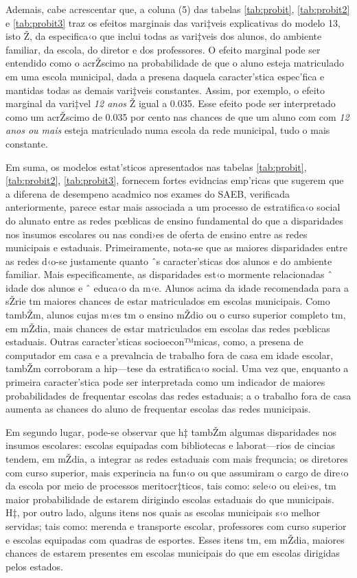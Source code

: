 \documentclass[a4paper, 12pt]{article}
\begin{document}
Ademais, cabe acrescentar que, a coluna (5) das tabelas \ref{tab:probit},  \ref{tab:probit2} e  \ref{tab:probit3} traz os efeitos marginais das vari‡veis explicativas do modelo 13, isto Ž, da especifica‹o que inclui todas as vari‡veis dos alunos, do ambiente familiar, da escola, do diretor e dos professores. O efeito marginal pode ser entendido como o acrŽscimo na probabilidade de que o aluno esteja matriculado em uma escola municipal, dada a presena daquela caracter’stica espec’fica e mantidas todas as demais vari‡veis constantes. Assim, por exemplo, o efeito marginal da vari‡vel \emph{12 anos} Ž igual a 0.035. Esse efeito pode ser interpretado como um acrŽscimo de 0.035 por cento nas chances de que um aluno com com \emph{12 anos ou mais} esteja matriculado numa escola da rede municipal, tudo o mais constante. 

Em suma, os modelos estat’sticos apresentados nas tabelas \ref{tab:probit}, \ref{tab:probit2}, \ref{tab:probit3}, fornecem fortes evidncias emp’ricas que sugerem que a diferena de desempeno acadmico nos exames do SAEB, verificada anteriormente, parece estar mais associada a um processo de estratifica‹o social do alunato entre as redes pœblicas de ensino fundamental do que a disparidades nos insumos escolares ou nas condi›es de oferta de ensino entre as redes municipais e estaduais. Primeiramente, nota-se que as maiores disparidades entre as redes d‹o-se justamente quanto ˆs caracter’sticas dos alunos e do ambiente familiar. Mais especificamente, as disparidades est‹o mormente relacionadas ˆ idade dos alunos e ˆ educa‹o da m‹e. Alunos acima da idade recomendada para a sŽrie tm maiores chances de estar matriculados em escolas municipais. Como tambŽm, alunos cujas m‹es tm o ensino mŽdio ou o curso superior completo tm, em mŽdia, mais chances de estar matriculados em escolas das redes pœblicas estaduais. Outras caracter’sticas socioecon™micas, como, a presena de computador em casa e a prevalncia de trabalho fora de casa em idade escolar, tambŽm corroboram a hip—tese da estratifica‹o social. Uma vez que, enquanto a primeira caracter’stica pode ser interpretada como um indicador de maiores probabilidades de frequentar escolas das redes estaduais; a o trabalho fora de casa aumenta as chances do aluno de frequentar escolas das redes municipais.

Em segundo lugar, pode-se observar que h‡ tambŽm algumas disparidades nos insumos escolares: escolas equipadas com bibliotecas e laborat—rios de cincias tendem, em mŽdia, a integrar as redes estaduais com mais frequncia; os diretores com curso superior, mais experincia na fun‹o ou que assumiram o cargo de dire‹o da escola por meio de processos meritocr‡ticos, tais como: sele‹o ou elei›es, tm maior probabilidade de estarem dirigindo escolas estaduais do que municipais. H‡, por outro lado, alguns itens nos quais as escolas municipais s‹o melhor servidas; tais como: merenda e transporte escolar, professores com curso superior e escolas equipadas com quadras de esportes. Esses itens tm, em mŽdia, maiores chances de estarem presentes em escolas municipais do que em escolas dirigidas pelos estados. 
\end{document}
